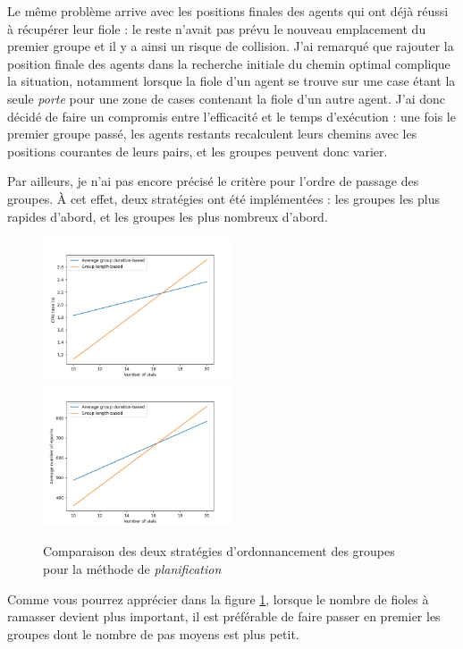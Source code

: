 \documentclass[letterpaper]{article}
\begin{document}
Le m\^eme probl\`eme arrive avec les positions finales des agents qui ont d\'ej\`a r\'eussi \`a r\'ecup\'erer leur fiole : le reste n'avait pas pr\'evu le nouveau emplacement du premier groupe et il y a ainsi un risque de collision.
J'ai remarqu\'e que rajouter la position finale des agents dans la recherche initiale du chemin optimal complique la situation, notamment lorsque la fiole d'un agent se trouve sur une case \'etant la seule \textit{porte} pour une zone de cases contenant la fiole d'un autre agent.
J'ai donc d\'ecid\'e de faire un compromis entre l'efficacit\'e et le temps d'ex\'ecution : une fois le premier groupe pass\'e, les agents restants recalculent leurs chemins avec les positions courantes de leurs pairs, et les groupes peuvent donc varier.

Par ailleurs, je n'ai pas encore pr\'ecis\'e le crit\`ere pour l'ordre de passage des groupes. \`A cet effet, deux strat\'egies ont \'et\'e impl\'ement\'ees : les groupes les plus rapides d'abord, et les groupes les plus nombreux d'abord.

\begin{figure}[!h]
  \centering
  \captionsetup{justification=centering}
  \includegraphics[width=0.5\textwidth]{planner_cpu_time}
  \includegraphics[width=0.5\textwidth]{planner_epoch}
  \caption{Comparaison des deux strat\'egies d'ordonnancement des groupes pour la m\'ethode de \textit{planification}}
  \label{fig:1j}
\end{figure}

Comme vous pourrez appr\'ecier dans la figure \ref{fig:1j}, lorsque le nombre de fioles \`a ramasser devient plus important, il est pr\'ef\'erable de faire passer en premier les groupes dont le nombre de pas moyens est plus petit.
\end{document}
